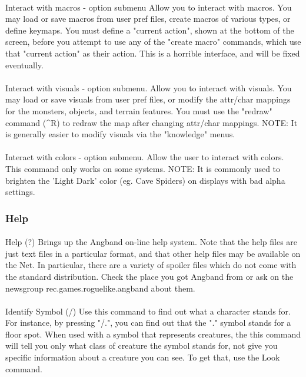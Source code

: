 \paragraph{}Interact with macros - option submenu Allow you to interact
with macros.  You may load or save macros from user pref files, create
macros of various types, or define keymaps. You must define a "current
action", shown at the bottom of the screen, before you attempt to use
any of the "create macro" commands, which use that "current action" as
their action. This is a horrible interface, and will be fixed
eventually.

\paragraph{}Interact with visuals - option submenu.  Allow you to
interact with visuals. You may load or save visuals from user pref
files, or modify the attr/char mappings for the monsters, objects, and
terrain features.  You must use the "redraw" command (\^{}R) to redraw
the map after changing attr/char mappings.  NOTE: It is generally easier
to modify visuals via the "knowledge" menus.

\paragraph{}Interact with colors - option submenu.  Allow the user to
interact with colors. This command only works on some systems.  NOTE: It
is commonly used to brighten the 'Light Dark' color (eg. Cave Spiders)
on displays with bad alpha settings.
 
\subsubsection{Help} 
\paragraph{}Help (?) Brings up the Angband on-line
help system. Note that the help files are just text files in a
particular format, and that other help files may be available on the
Net. In particular, there are a variety of spoiler files which do not
come with the standard distribution. Check the place you got Angband
from or ask on the newsgroup rec.games.roguelike.angband about them.

\paragraph{}Identify Symbol (/) Use this command to find out what a
character stands for. For instance, by pressing "/.", you can find out
that the "." symbol stands for a floor spot. When used with a symbol
that represents creatures, the this command will tell you only what
class of creature the symbol stands for, not give you specific
information about a creature you can see. To get that, use the Look
command.

